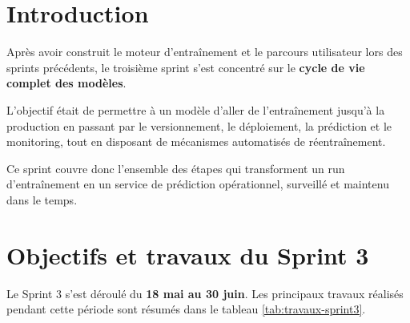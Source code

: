 \section{Introduction}
\label{sec:ch5-introduction}

Après avoir construit le moteur d'entraînement et le parcours
utilisateur lors des sprints précédents, le troisième sprint s'est
concentré sur le \textbf{cycle de vie complet des modèles}.

L'objectif était de permettre à un modèle d'aller de l'entraînement
jusqu'à la production en passant par le versionnement, le déploiement,
la prédiction et le monitoring, tout en disposant de mécanismes
automatisés de réentraînement.

Ce sprint couvre donc l'ensemble des étapes qui transforment un run
d'entraînement en un service de prédiction opérationnel, surveillé et
maintenu dans le temps.



\section{Objectifs et travaux du Sprint 3}
\label{sec:sprint3-objectifs}

Le Sprint 3 s'est déroulé du \textbf{18 mai au 30 juin}. Les principaux
travaux réalisés pendant cette période sont résumés dans le tableau
\ref{tab:travaux-sprint3}.

